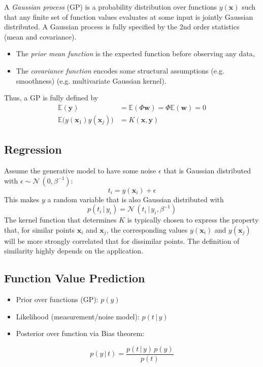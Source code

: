 \documentclass[a4paper, 11pt, accentcolor = tud3b]{tudreport}
\newcommand{\E}{\ensuremath{\mathbb{E}}}
\newcommand{\given}{\ensuremath{\,\vert\,}}
\renewcommand{\vec}[1]{\mathbf{#1}}
\begin{document}
			A \emph{Gaussian process} (GP) is a probability distribution over functions \(y(\vec{x})\) such that any finite set of function values evaluates at some input is jointly Gaussian distributed. A Gaussian process is fully specified by the 2nd order statistics (mean and covariance).
			\begin{itemize}
				\item The \emph{prior mean function} is the expected function before observing any data,
				\item The \emph{covariance function} encodes some structural assumptions (e.g. smoothness) (e.g. multivariate Gaussian kernel).
			\end{itemize}
			Thus, a GP is fully defined by
			\begin{align}
				\E(\vec{y}) &= \E(\Phi\vec{w}) = \Phi \E(\vec{w}) = 0 \\
				\E\big( y(\vec{x}_1) y(\vec{x}_j) \big) &= K(\vec{x}, \vec{y})
			\end{align}

			\subsection{Regression}
				Assume the generative model to have some noise \(\epsilon\) that is Gaussian distributed with \( \epsilon \sim \mathcal{N}\,(0, \beta^{-1}) \):
				\begin{equation}
					t_i = y(\vec{x}_i) + \epsilon
				\end{equation}
				This makes \(y\) a random variable that is also Gaussian distributed with
				\begin{equation}
					p(t_i \given y_i) = \mathcal{N}\,(t_i \given y_i, \beta^{-1})
				\end{equation}
				The kernel function that determines \(K\) is typically chosen to express the property that, for similar points \( \vec{x}_i \) and \( \vec{x}_j \), the corresponding values \( y(\vec{x}_i) \) and \( y(\vec{x}_j) \) will be more strongly correlated that for dissimilar points. The definition of similarity highly depends on the application.

			\subsection{Function Value Prediction}
				\begin{itemize}
					\item Prior over functions (GP): \( p(y) \)
					\item Likelihood (measurement/noise model): \( p(t \given y) \)
					\item Posterior over function via Bias theorem:
				\end{itemize}
				\begin{equation}
					p(y \given t) = \frac{p(t \given y) \, p(y)}{p(t)}
				\end{equation}
				
\end{document}
